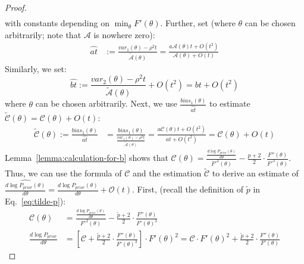 \begin{proof}
\begin{align*}
        \end{align*}
        with constants depending on $\min_\theta F'(\theta)$.
        Further, set (where $\theta$ can be chosen arbitrarily; note that $\mathcal{A}$ is nowhere zero):
        \begin{align*}
        \widehat{at} &:= \frac{var_1(\theta) - \rho^2t}{\tilde{\mathcal{A}}(\theta)}
        = \frac{a\mathcal{A}(\theta)t+O(t^2)}{\mathcal{A}(\theta)+O(t)}
    \end{align*}
    Similarly, we set:
    \begin{equation*}
        \widehat{bt} := \frac{var_2(\theta) - \rho^2t}{\tilde{\mathcal{A}}(\theta)} +O(t^2) = bt + O(t^2)
    \end{equation*}
    where $\theta$ can be chosen arbitrarily.
    Next, we use $\frac{bias_1(\theta)}{\widehat{at}}$ to estimate $\tilde{\mathcal{C}}(\theta)= \mathcal{C}(\theta) +O(t)$:
    \begin{align*}
        \tilde{\mathcal{C}}(\theta) := \frac{bias_1(\theta)}{\widehat{at}} &= \frac{bias_1(\theta)}{\frac{var_1(\theta) - \rho^2t}{\tilde{\mathcal{A}}(\theta)}}
        = \frac{a\mathcal{C}(\theta)t + O(t^2)}{at + O(t^2)}
        = \mathcal{C}(\theta) + O(t)
\end{align*}
Lemma~\ref{lemma:calculation-for-b} shows that $\mathcal{C}(\theta) = \frac{\frac{d \log P_{prior}(\theta)}{d \theta}}{F'^2(\theta)} - \frac{p+2}{2} \cdot \frac{F''(\theta)}{F'^3(\theta)}$.
    Thus, we can use the formula of $\mathcal{C}$ and the estimation $\tilde{\mathcal{C}}$ to derive an estimate of $\widehat{\frac{d \log P_{prior}(\theta)}{d \theta}} = \frac{d \log P_{prior}(\theta)}{d \theta} + \mathcal{O}(t)$. 
    First, (recall the definition of $\tilde{p}$ in Eq.~\ref{eq:tilde-p}):
    \begin{align*}
        \mathcal{C}(\theta) &= \frac{\frac{d \log P_{prior}(\theta)}{d \theta}}{F'^2(\theta)} - \frac{\tilde{p}+2}{2} \cdot \frac{F''(\theta)}{F'(\theta)^3}\\
        \frac{d \log P_{prior}}{d \theta} &= [\mathcal{C} + \frac{\tilde{p}+2}{2} \cdot \frac{F''(\theta)}{F'(\theta)^3}] \cdot F'(\theta)^2 
        =\mathcal{C} \cdot F'(\theta)^2 + \frac{\tilde{p}+2}{2} \cdot \frac{F''(\theta)}{F'(\theta)}
        \end{align*}


\end{proof}
